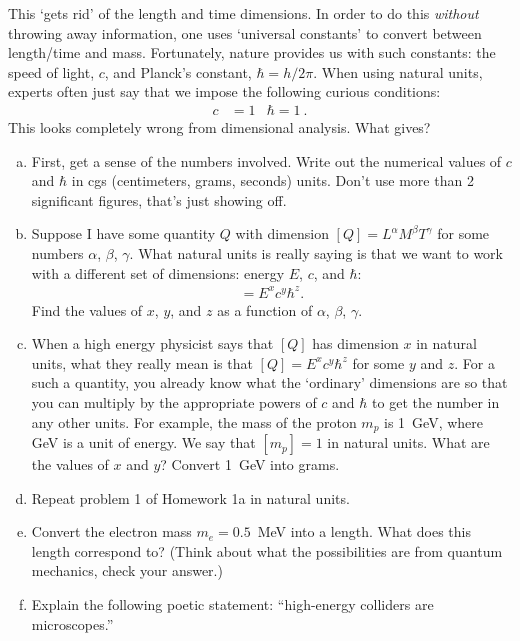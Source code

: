 \documentclass[12pt]{article}
\numberwithin{equation}{section}    %
\begin{document}
This `gets rid' of the length and time dimensions. In order to do this \emph{without} throwing away information, one uses `universal constants' to convert between length/time and mass. Fortunately, nature provides us with such constants: the speed of light, $c$, and Planck's constant, $\hbar = h/2\pi$. When using natural units, experts often just say that we impose the following curious conditions:
\begin{align}
	c &= 1 
	&
	\hbar = 1 \ .
\end{align}
This looks completely wrong from dimensional analysis. What gives?

\begin{enumerate}[(a)]
	\item First, get a sense of the numbers involved. Write out the numerical values of $c$ and $\hbar$ in cgs (centimeters, grams, seconds) units. Don't use more than 2 significant figures, that's just showing off. 
	\item Suppose I have some quantity $Q$ with dimension $[Q] = L^\alpha M^\beta T^\gamma$ for some numbers $\alpha$, $\beta$, $\gamma$. What natural units is really saying is that we want to work with a different set of dimensions: energy $E$, $c$, and $\hbar$:
		\begin{align*}
			[Q] = E^x c^y \hbar^z .
		\end{align*}
		Find the values of $x$, $y$, and $z$ as a function of $\alpha$, $\beta$, $\gamma$.
	\item When a high energy physicist says that $[Q]$ has dimension $x$ in natural units, what they really mean is that $[Q] = E^x c^y \hbar^z$ for some $y$ and $z$. For a such a quantity, you already know what the `ordinary' dimensions are so that you can multiply by the appropriate powers of $c$ and $\hbar$ to get the number in any other units. For example, the mass of the proton $m_p$ is 1~GeV, where GeV is a unit of energy. We say that $[m_p] = 1$ in natural units. What are the values of $x$ and $y$? Convert 1~GeV into grams.
	\item Repeat problem 1 of Homework 1a in natural units.
	\item Convert the electron mass $m_e = 0.5$~MeV into a length. What does this length correspond to? (Think about what the possibilities are from quantum mechanics, check your answer.)
	\item Explain the following poetic statement: ``high-energy colliders are microscopes.''
\end{enumerate}
\end{document}
